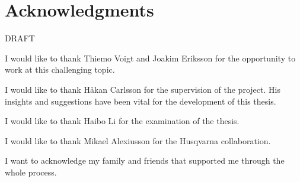 
\section*{Acknowledgments }


DRAFT

\noindent I would like to thank Thiemo Voigt and Joakim Eriksson for the opportunity to work at this challenging topic.

I would like to thank Håkan Carlsson for the supervision of the project.
His insights and suggestions have been vital for the development of this thesis.

I would like to thank Haibo Li for the examination of the thesis.

I would like to thank Mikael Alexiusson for the Husqvarna collaboration.

I want to acknowledge my family and friends that supported me through the whole process.

\acknowlegmentssignature
